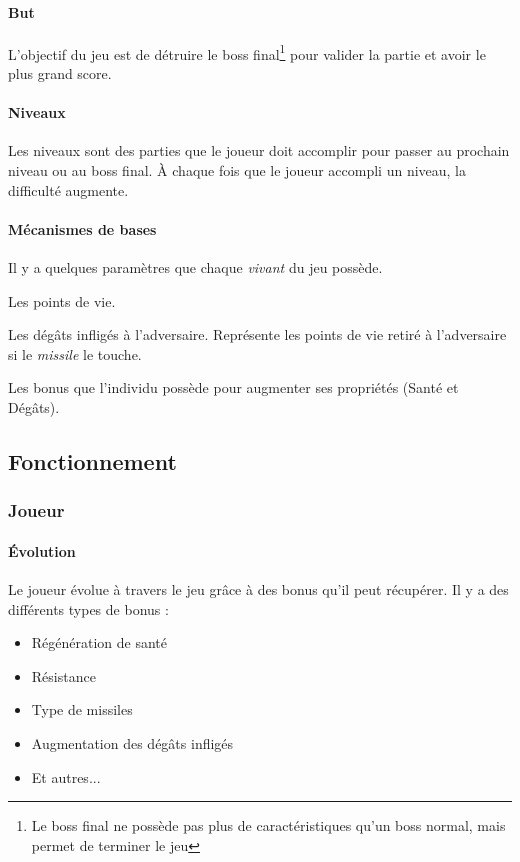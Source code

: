 \documentclass[11pt, a4paper, oneside]{article}
\begin{document}
\paragraph{But}
L'objectif du jeu est de détruire le boss final\footnote{Le boss final ne possède pas plus de caractéristiques qu'un boss normal, mais permet de terminer le jeu} pour valider la partie et avoir le plus grand score.
\paragraph{Niveaux}
Les niveaux sont des parties que le joueur doit accomplir pour passer au prochain niveau ou au boss final. À chaque fois que le joueur accompli un niveau, la difficulté augmente.
\paragraph{Mécanismes de bases}
Il y a quelques paramètres que chaque \emph{vivant} du jeu possède.
\begin{description}
\setlength{\itemindent}{-.cm}
	\item[— Santé] Les points de vie.
	\item[— Dégâts] Les dégâts infligés à l'adversaire. Représente les points de vie retiré à l'adversaire si le \emph{missile} le touche.
	\item[— Bonus] Les bonus que l'individu possède pour augmenter ses propriétés (Santé et Dégâts).
\end{description}
\subsection{Fonctionnement}
\subsubsection{Joueur}
\paragraph{Évolution}
Le joueur évolue à travers le jeu grâce à des bonus qu'il peut récupérer. Il y a des différents types de bonus :
\begin{itemize}
	\item Régénération de santé
	\item Résistance
	\item Type de missiles
	\item Augmentation des dégâts infligés
	\item Et autres...
\end{itemize}
\end{document}
